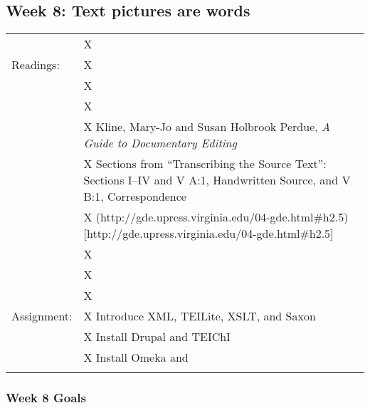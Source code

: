 \documentclass[]{article}
\begin{document}
\subsection{Week 8: Text pictures are
words}\label{week-8-text-pictures-are-words}

\begin{longtable}[c]{@{}ll@{}}
\toprule\addlinespace
& X
\\\addlinespace
Readings: & X
\\\addlinespace
& X
\\\addlinespace
& X
\\\addlinespace
& X Kline, Mary-Jo and Susan Holbrook Perdue, \emph{A Guide to
Documentary Editing}
\\\addlinespace
& X Sections from ``Transcribing the Source Text'': Sections I--IV and V
A:1, Handwritten Source, and V B:1, Correspondence
\\\addlinespace
& X
(http://gde.upress.virginia.edu/04-gde.html\#h2.5){[}http://gde.upress.virginia.edu/04-gde.html\#h2.5{]}
\\\addlinespace
& X
\\\addlinespace
& X
\\\addlinespace
& X
\\\addlinespace
Assignment: & X Introduce XML, TEILite, XSLT, and Saxon
\\\addlinespace
& X Install Drupal and TEIChI
\\\addlinespace
& X Install Omeka and
\\\addlinespace
\bottomrule
\end{longtable}

\subsubsection{Week 8 Goals}\label{week-8-goals}
\end{document}
